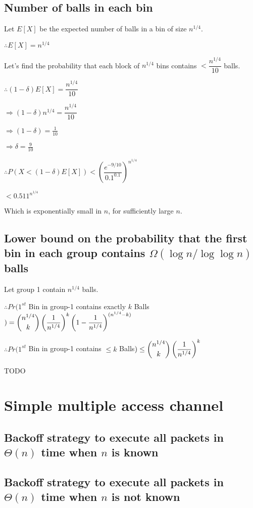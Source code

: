 \documentclass{article}
\begin{document}
\subsection{Number of balls in each bin}

Let $E[X] $ be the expected number of balls in a bin of size $n^{1/4}$.

$\therefore E[X] = n^{1/4}$

Let's find the probability that each block of $n^{1/4}$ bins contains $< \dfrac{n^{1/4}}{10}$ balls.

$\therefore (1-\delta)E[X] = \dfrac{n^{1/4}}{10}$

$\Rightarrow (1-\delta)n^{1/4} = \dfrac{n^{1/4}}{10}$

$\Rightarrow (1-\delta) = \frac{1}{10}$

$\Rightarrow \delta = \frac{9}{10}$

$\therefore P(X < (1-\delta)E[X]) < \left(\dfrac{e^{-9/10}}{0.1^{0.1}}\right)^{n^{1/4}}$

$< 0.511^{n^{1/4}}$

Which is exponentially small in $n$, for sufficiently large $n$.


\subsection{Lower bound on the probability that the first bin in each group contains $\Omega(\log{n}/\log{\log{n}})$ balls}

Let group 1 contain $n^{1/4}$ balls.

$\therefore Pr(1^{st}$ Bin in group-1 contains exactly $k$ Balls$) = \dbinom{n^{1/4}}{k} \left( \dfrac{1}{n^{1/4}} \right)^{k} \left( 1 - \dfrac{1}{n^{1/4}} \right)^{(n^{1/4} - k)}$

$\therefore Pr(1^{st}$ Bin in group-1 contains $\le k$ Balls$) \le \dbinom{n^{1/4}}{k} \left( \dfrac{1}{n^{1/4}} \right)^{k}$

TODO

\clearpage

\section {Simple multiple access channel}

\subsection{Backoff strategy to execute all packets in $\Theta(n)$ time when $n$ is \textbf{known}}

\subsection{Backoff strategy to execute all packets in $\Theta(n)$ time when $n$ is \textbf{not known}}


\clearpage
\end{document}
